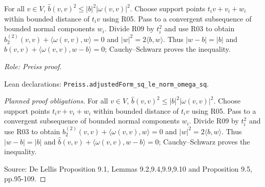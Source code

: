 \begin{lemma}
\label{lem:rigidity-pointwise-quadratic-bound}







For all $v\in V$,
$\widehat b(v,v)^2\leq |b|^2|\omega(v,v)|^2$.
Choose support points $t_i v+v_i+w_i$ within bounded distance of $t_i v$ using
R05. Pass to a convergent subsequence of bounded normal components $w_i$.
Divide R09 by $t_i^2$ and use R03 to obtain
$b_2^{(2)}(v,v)+\langle\omega(v,v),w\rangle=0$ and
$|w|^2=2\langle b,w\rangle$.
Thus $|w-b|=|b|$ and
$\widehat b(v,v)+\langle\omega(v,v),w-b\rangle=0$; Cauchy--Schwarz proves
the inequality.
\par\emph{Role: Preiss proof.}
\par Lean declarations: \texttt{Preiss.adjustedForm\_sq\_le\_norm\_omega\_sq}.
\end{lemma}
\begin{proof}[Planned proof obligations]

For all $v\in V$,
$\widehat b(v,v)^2\leq |b|^2|\omega(v,v)|^2$.
Choose support points $t_i v+v_i+w_i$ within bounded distance of $t_i v$ using
R05. Pass to a convergent subsequence of bounded normal components $w_i$.
Divide R09 by $t_i^2$ and use R03 to obtain
$b_2^{(2)}(v,v)+\langle\omega(v,v),w\rangle=0$ and
$|w|^2=2\langle b,w\rangle$.
Thus $|w-b|=|b|$ and
$\widehat b(v,v)+\langle\omega(v,v),w-b\rangle=0$; Cauchy--Schwarz proves
the inequality.
\par Source: De Lellis Proposition 9.1, Lemmas 9.2,9.4,9.9,9.10 and Proposition 9.5, pp.95-109.
\end{proof}

